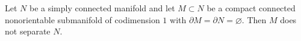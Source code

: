 Let $N$ be a simply connected manifold and let $M \subset N$ be a compact connected nonorientable submanifold of codimension $1$ with $\partial M = \partial N = \varnothing$. Then $M$ does not separate $N$.
